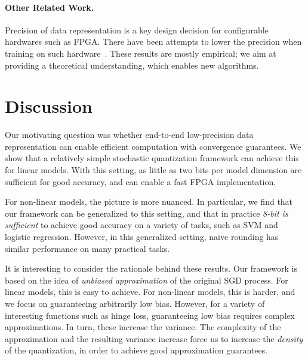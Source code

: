\documentclass{article}
\begin{document}
\vspace{-0.5em}
\paragraph{Other Related Work.} Precision of data
representation is a key design decision
for configurable hardwares such as FPGA. There have been attempts to
lower the precision when training on such hardware~\cite{Kim:2011:ICASSP}. 
These results are mostly empirical; we
aim at providing a theoretical understanding, which 
enables new algorithms.

\vspace{-0.5em}
\section{Discussion}
\label{sec:conclusions}

\vspace{-0.5em}
Our motivating question was whether end-to-end low-precision data representation can enable efficient computation with convergence guarantees. 
We show that a relatively simple stochastic quantization framework can achieve this for linear models. 
With this setting, as little as two bits per model dimension are sufficient for good accuracy, and can enable a fast FPGA implementation.  

\vspace{-0.2em}
For non-linear models, the picture is more nuanced. 
In particular, we find that our framework can be generalized to this setting, and that in practice \emph{8-bit is sufficient} to achieve good accuracy on a variety of tasks, such as SVM and logistic regression. 
However, in this generalized setting, naive rounding has similar performance on many practical tasks. 

\vspace{-0.2em}
It is interesting to consider the rationale behind these results. Our framework is based on the idea of \emph{unbiased approximation} of the original SGD process. For linear models, this is easy to achieve. For non-linear models, this is harder, and we focus on guaranteeing arbitrarily low bias. 
However, for a variety of interesting functions such as hinge loss, guaranteeing low bias requires complex approximations. In turn, these increase the variance. The complexity of the approximation and the resulting variance increase force us to increase the \emph{density} of the quantization, in order to achieve good approximation guarantees. 


\cleardoublepage







\end{document}
